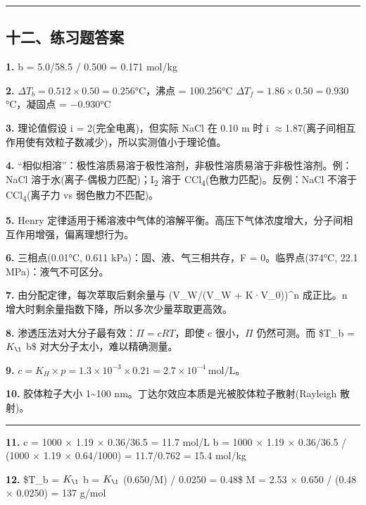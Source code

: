 \documentclass[a4paper,11pt]{ctexart}
\newcommand{\箭}{\ensuremath{\rightarrow}}
\newcommand{\左箭}{\ensuremath{\leftarrow}}
\newcommand{\上箭}{\ensuremath{\uparrow}}
\newcommand{\下箭}{\ensuremath{\downarrow}}
\newcommand{\衡}{\ensuremath{\rightleftharpoons}}
\newcommand{\双箭}{\ensuremath{\leftrightarrow}}
\newcommand{\约等于}{\ensuremath{\approx}}
\newcommand{\小于等于}{\ensuremath{\leq}}
\newcommand{\大于等于}{\ensuremath{\geq}}
\newcommand{\不等于}{\ensuremath{\neq}}
\newcommand{\西格马}{\ensuremath{\sigma}}
\newcommand{\派}{\ensuremath{\pi}}
\begin{document}
\begin{center}\rule{0.5\linewidth}{0.5pt}\end{center}

\subsection{十二、练习题答案}\label{ux5341ux4e8cux7ec3ux4e60ux9898ux7b54ux6848}

\textbf{1.} b = 5.0/58.5 / 0.500 = 0.171 mol/kg

\textbf{2.} \(\Delta T_b = 0.512 \times 0.50 = 0.256\)°C，沸点 = 100.256°C
\(\Delta T_f = 1.86 \times 0.50 = 0.930\)°C，凝固点 = −0.930°C

\textbf{3.} 理论值假设 i = 2(完全电离)，但实际 NaCl 在 0.10 m 时 i \约等于 1.87(离子间相互作用使有效粒子数减少)，所以实测值小于理论值。

\textbf{4.} ``相似相溶''：极性溶质易溶于极性溶剂，非极性溶质易溶于非极性溶剂。例：NaCl 溶于水(离子-偶极力匹配)；I\textsubscript{2} 溶于 CCl\textsubscript{4}(色散力匹配)。反例：NaCl 不溶于 CCl\textsubscript{4}(离子力 vs 弱色散力不匹配)。

\textbf{5.} Henry 定律适用于稀溶液中气体的溶解平衡。高压下气体浓度增大，分子间相互作用增强，偏离理想行为。

\textbf{6.} 三相点(0.01°C, 0.611 kPa)：固、液、气三相共存，F = 0。临界点(374°C, 22.1 MPa)：液气不可区分。

\textbf{7.} 由分配定律，每次萃取后剩余量与 (V\_W/(V\_W + K·V\_0))\^{}n 成正比。n 增大时剩余量指数下降，所以多次少量萃取更高效。

\textbf{8.} 渗透压法对大分子最有效：\(\Pi = cRT\)，即使 c 很小，\(\Pi\) 仍然可测。而 \$\Delta T\_b = \(K_{\1}\) \cdot b\$ 对大分子太小，难以精确测量。

\textbf{9.} \(c = K_H \times p = 1.3 \times 10^{-3} \times 0.21 = 2.7 \times 10^{-4}\ \mathrm{mol/L}\)。

\textbf{10.} 胶体粒子大小 1\textasciitilde100 nm。丁达尔效应本质是光被胶体粒子散射(Rayleigh 散射)。

\begin{center}\rule{0.5\linewidth}{0.5pt}\end{center}

\textbf{11.} c = 1000 × 1.19 × 0.36/36.5 = 11.7 mol/L
b = 1000 × 1.19 × 0.36/36.5 / (1000 × 1.19 × 0.64/1000) = 11.7/0.762 = 15.4 mol/kg

\textbf{12.} \$\Delta T\_b = \(K_{\1}\) \cdot b = \(K_{\1}\) \cdot (0.650/M) / 0.0250 = 0.48\$
M = 2.53 × 0.650 / (0.48 × 0.0250) = 137 g/mol
\end{document}
